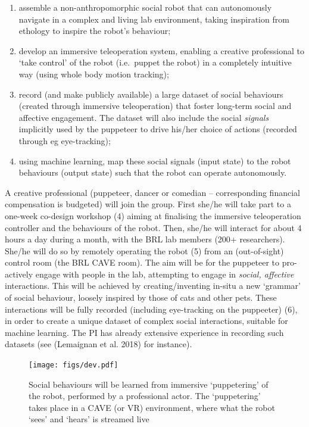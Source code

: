 \documentclass[11pt]{report}
\begin{document}
\begin{enumerate}
\def\labelenumi{\arabic{enumi}.}
\item
  assemble a non-anthropomorphic social robot that can autonomously
  navigate in a complex and living lab environment, taking inspiration
  from ethology to inspire the robot's behaviour;
\item
  develop an immersive teleoperation system, enabling a creative
  professional to `take control' of the robot (i.e.~puppet the robot) in
  a completely intuitive way (using whole body motion tracking);
\item
  record (and make publicly available) a large dataset of social
  behaviours (created through immersive teleoperation) that foster
  long-term social and affective engagement. The dataset will also
  include the social \emph{signals} implicitly used by the puppeteer to
  drive his/her choice of actions (recorded through eg eye-tracking);
\item
  using machine learning, map these social signals (input state) to the
  robot behaviours (output state) such that the robot can operate
  autonomously.
\end{enumerate}

A creative professional (puppeteer, dancer or comedian --
corresponding financial compensation is budgeted) will join the group.
First she/he will take part to a one-week co-design workshop (4) aiming
at finalising the immersive teleoperation controller and the behaviours
of the robot. Then, she/he will interact for about 4 hours a day during
a month, with the BRL lab members (200+ researchers). She/he will do so
by remotely operating the robot (5) from an (out-of-sight) control room
(the BRL CAVE room). The aim will be for the puppeteer to pro-actively
engage with people in the lab, attempting to engage in \emph{social,
affective} interactions. This will be achieved by creating/inventing
in-situ a new `grammar' of social behaviour, loosely inspired by those
of cats and other pets. These interactions will be fully recorded
(including eye-tracking on the puppeeter) (6), in order to create a
unique dataset of complex social interactions, suitable for machine
learning. The PI has already extensive experience in recording such
datasets (see (Lemaignan et al. 2018) for instance).

\begin{figure}
    \centering
    \texttt{[image: figs/dev.pdf]}
    \caption{\label{fig:support}
    Social behaviours will be learned from immersive `puppetering' of the
    robot, performed by a professional actor. The `puppetering' takes place
    in a CAVE (or VR) environment, where what the robot `sees' and `hears'
    is streamed live}
\end{figure}
\end{document}
